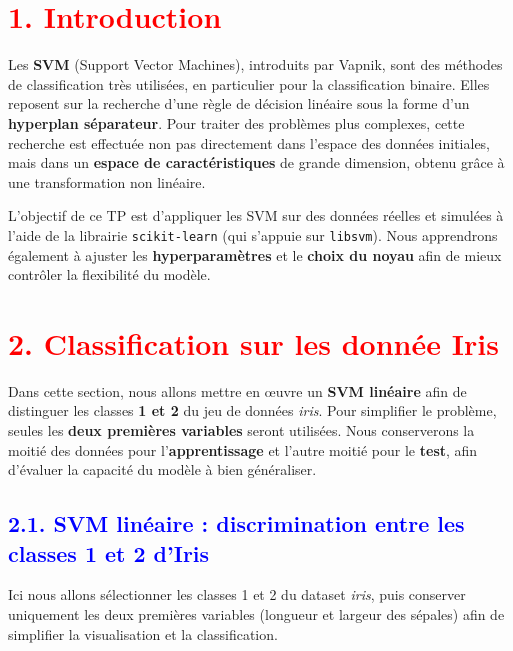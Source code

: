 \documentclass[
  12pt,
]{article}
\begin{document}
\section{\texorpdfstring{\textcolor{red}{1. Introduction}}{}}\label{section}

Les \textbf{SVM} (Support Vector Machines), introduits par Vapnik, sont
des méthodes de classification très utilisées, en particulier pour la
classification binaire. Elles reposent sur la recherche d'une règle de
décision linéaire sous la forme d'un \textbf{hyperplan séparateur}. Pour
traiter des problèmes plus complexes, cette recherche est effectuée non
pas directement dans l'espace des données initiales, mais dans un
\textbf{espace de caractéristiques} de grande dimension, obtenu grâce à
une transformation non linéaire.

L'objectif de ce TP est d'appliquer les SVM sur des données réelles et
simulées à l'aide de la librairie \texttt{scikit-learn} (qui s'appuie
sur \texttt{libsvm}). Nous apprendrons également à ajuster les
\textbf{hyperparamètres} et le \textbf{choix du noyau} afin de mieux
contrôler la flexibilité du modèle. \newpage


\section{\texorpdfstring{\textcolor{red}{2. Classification sur les donnée Iris}}{}}\label{section-1}

Dans cette section, nous allons mettre en œuvre un \textbf{SVM linéaire}
afin de distinguer les classes \textbf{1 et 2} du jeu de données
\textit{iris}. Pour simplifier le problème, seules les
\textbf{deux premières variables} seront utilisées. Nous conserverons la
moitié des données pour l'\textbf{apprentissage} et l'autre moitié pour
le \textbf{test}, afin d'évaluer la capacité du modèle à bien
généraliser.

\subsection{\texorpdfstring{\textcolor{blue}{2.1. SVM linéaire : discrimination entre les classes 1 et 2 d’Iris}}{}}\label{section-2}

Ici nous allons sélectionner les classes 1 et 2 du dataset
\textit{iris}, puis conserver uniquement les deux premières variables
(longueur et largeur des sépales) afin de simplifier la visualisation et
la classification.
\end{document}
